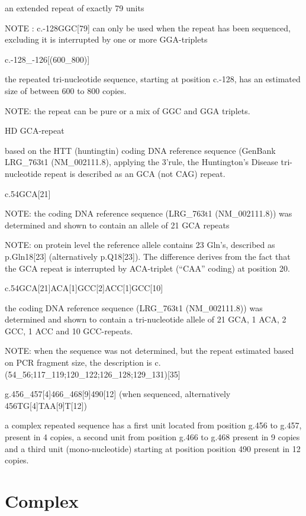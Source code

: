 \documentclass{book}
\begin{document}
	an extended repeat of exactly 79 units

	NOTE : c.-128GGC[79] can only be used when the repeat has been sequenced, excluding it is interrupted by one or more GGA-triplets

	c.-128\_-126[(600\_800)]

	the repeated tri-nucleotide sequence, starting at position c.-128, has an estimated size of between 600 to 800 copies.

	NOTE: the repeat can be pure or a mix of GGC and GGA triplets.

	HD GCA-repeat

	based on the HTT (huntingtin) coding DNA reference sequence (GenBank LRG\_763t1 (NM\_002111.8), applying the 3’rule, the Huntington’s Disease tri-nucleotide repeat is described as an GCA (not CAG) repeat.

	c.54GCA[21]

	NOTE: the coding DNA reference sequence (LRG\_763t1 (NM\_002111.8)) was determined and shown to contain an allele of 21 GCA repeats

	NOTE: on protein level the reference allele contains 23 Gln’s, described as p.Gln18[23] (alternatively p.Q18[23]). The difference derives from the fact that the GCA repeat is interrupted by ACA-triplet (“CAA” coding) at position 20.

	c.54GCA[21]ACA[1]GCC[2]ACC[1]GCC[10]

	the coding DNA reference sequence (LRG\_763t1 (NM\_002111.8)) was determined and shown to contain a tri-nucleotide allele of 21 GCA, 1 ACA, 2 GCC, 1 ACC and 10 GCC-repeats.

	NOTE: when the sequence was not determined, but the repeat estimated based on PCR fragment size, the description is c.(54\_56;117\_119;120\_122;126\_128;129\_131)[35]

	g.456\_457[4]466\_468[9]490[12] (when sequenced, alternatively 456TG[4]TAA[9]T[12])

	a complex repeated sequence has a first unit located from position g.456 to g.457, present in 4 copies, a second unit from position g.466 to g.468 present in 9 copies and a third unit (mono-nucleotide) starting at position position 490 present in 12 copies.

	

	\section{Complex}

	
\end{document}
